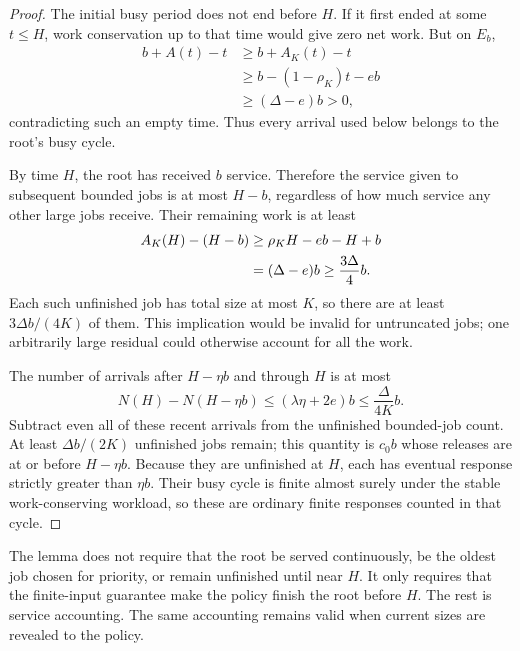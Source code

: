 \begin{proof}
The initial busy period does not end before $H$. If it first ended at some $t\leq H$, work conservation up to that time would give zero net work. But on $E_b$,
\begin{align*}
 b+A(t)-t
 &\geq b+A_K(t)-t\\
 &\geq b-(1-\rho_K)t-eb\\
 &\geq(\Delta-e)b>0,
\end{align*}
contradicting such an empty time. Thus every arrival used below belongs to the root's busy cycle.

By time $H$, the root has received $b$ service. Therefore the service given to subsequent bounded jobs is at most $H-b$, regardless of how much service any other large jobs receive. Their remaining work is at least
\begin{align}
 A_K(H)-(H-b)
 &\geq\rho_KH-eb-H+b\notag\\
 &=(\Delta-e)b\geq\frac{3\Delta}{4}b.\label{eq:remaining-bounded}
\end{align}
Each such unfinished job has total size at most $K$, so there are at least $3\Delta b/(4K)$ of them. This implication would be invalid for untruncated jobs; one arbitrarily large residual could otherwise account for all the work.

The number of arrivals after $H-\eta b$ and through $H$ is at most
\begin{equation}\label{eq:recent-count}
 N(H)-N(H-\eta b)
 \leq(\lambda\eta+2e)b\leq\frac\Delta{4K}b.
\end{equation}
Subtract even all of these recent arrivals from the unfinished bounded-job count. At least $\Delta b/(2K)$ unfinished jobs remain; this quantity is $c_0b$ whose releases are at or before $H-\eta b$. Because they are unfinished at $H$, each has eventual response strictly greater than $\eta b$. Their busy cycle is finite almost surely under the stable work-conserving workload, so these are ordinary finite responses counted in that cycle.
\end{proof}

The lemma does not require that the root be served continuously, be the oldest job chosen for priority, or remain unfinished until near $H$. It only requires that the finite-input guarantee make the policy finish the root before $H$. The rest is service accounting. The same accounting remains valid when current sizes are revealed to the policy.

